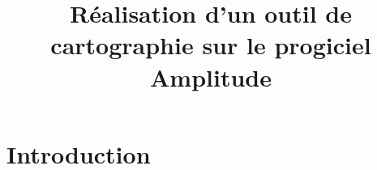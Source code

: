 \documentclass{polytech/polytech}
\title{Réalisation d'un outil de cartographie sur le progiciel Amplitude}
\begin{document}
\chapter*{Introduction}
\end{document}
